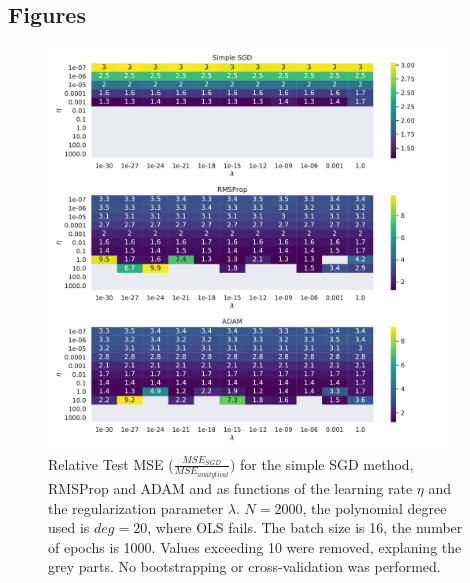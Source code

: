 \documentclass[11pt,a4paper,titlepage]{article}
\begin{document}
\subsection{Figures}
\begin{figure}[H]
\centering
\includegraphics[width=0.95\textwidth]{Ridge_error_SGD.pdf}
\caption[Relative Test MSE with different SGD methods for Ridge]{Relative Test MSE  ($\frac{MSE_{SGD}}{MSE_{analytical}})$ for the simple SGD method, RMSProp and ADAM and as functions of the learning rate $\eta$ and the regularization parameter $\lambda$. $N=2000$, the polynomial degree used is $deg=20$, where OLS fails. The batch size is 16, the number of epochs is 1000. Values exceeding 10 were removed, explaning the grey parts. No bootstrapping or cross-validation was performed.} \label{fig:DifferentSGDRIDE}
\end{figure}
\end{document}
